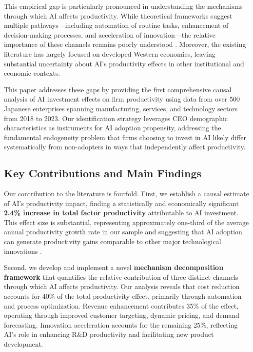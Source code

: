 \documentclass[12pt, a4paper]{article}
\begin{document}
This empirical gap is particularly pronounced in understanding the mechanisms through which AI affects productivity. While theoretical frameworks suggest multiple pathways—including automation of routine tasks, enhancement of decision-making processes, and acceleration of innovation—the relative importance of these channels remains poorly understood \citep{brynjolfsson2019artificial, agrawal2018prediction}. Moreover, the existing literature has largely focused on developed Western economies, leaving substantial uncertainty about AI's productivity effects in other institutional and economic contexts.

This paper addresses these gaps by providing the first comprehensive causal analysis of AI investment effects on firm productivity using data from over 500 Japanese enterprises spanning manufacturing, services, and technology sectors from 2018 to 2023. Our identification strategy leverages CEO demographic characteristics as instruments for AI adoption propensity, addressing the fundamental endogeneity problem that firms choosing to invest in AI likely differ systematically from non-adopters in ways that independently affect productivity.

\subsection{Key Contributions and Main Findings}

Our contribution to the literature is fourfold. First, we establish a causal estimate of AI's productivity impact, finding a statistically and economically significant \textbf{2.4\% increase in total factor productivity} attributable to AI investment. This effect size is substantial, representing approximately one-third of the average annual productivity growth rate in our sample and suggesting that AI adoption can generate productivity gains comparable to other major technological innovations \citep{bresnahan1995general}.

Second, we develop and implement a novel \textbf{mechanism decomposition framework} that quantifies the relative contribution of three distinct channels through which AI affects productivity. Our analysis reveals that cost reduction accounts for 40\% of the total productivity effect, primarily through automation and process optimization. Revenue enhancement contributes 35\% of the effect, operating through improved customer targeting, dynamic pricing, and demand forecasting. Innovation acceleration accounts for the remaining 25\%, reflecting AI's role in enhancing R\&D productivity and facilitating new product development.
\end{document}
